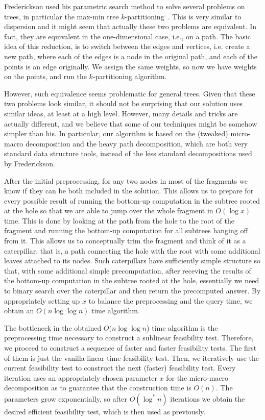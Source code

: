 \documentclass[11pt,a4paper]{article}
\theoremstyle{definition}
\theoremstyle{remark}
\begin{document}
Frederickson used his parametric search method to solve several problems on trees, in particular
the max-min tree $k$-partitioning~\cite{Frederickson1991}. This is very similar to dispersion and it might
seem that actually these two problems are equivalent. In fact, they are equivalent in the one-dimensional case,
i.e., on a path. The basic idea of this reduction, is to switch between the edges and vertices, i.e. create a new path, where each of the edges is a node in the original path, and each of the points is an edge originally. We assign the same weights, so now we have weights on the points, and run the $k$-partitioning algorithm.

However, such equivalence seems problematic for general trees. Given that these two problems look similar, it should not be surprising that our solution uses similar
ideas, at least at a high level. However, many details and tricks are actually different, and we believe
that some of our techniques might be somehow simpler than his. %
In particular, our algorithm is based on the (tweaked) micro-macro decomposition and the heavy path
decomposition, which are both very standard data structure tools, instead of the less standard
decompositions used by Frederickson.%

After the initial preprocessing, for any two nodes in most of the fragments we know if they can be
both included in the solution. This allows us to prepare for every possible result of running the
bottom-up computation in the subtree rooted at the hole so that we are able to jump over the whole
fragment in $O(\log x)$ time. This is done by looking at the path from the hole to the root of the
fragment and running the bottom-up computation for all subtrees hanging off from it. This allows
us to conceptually trim the fragment and think of it as a caterpillar, that is, a path connecting
the hole with the root with some additional leaves attached to its nodes. Such caterpillars have
sufficiently simple structure so that, with some additional simple precomputation, after receving
the results of the bottom-up computation in the subtree rooted at the hole, essentially we need
to binary search over the caterpillar and then return the precomputed answer. By appropriately
setting up $x$ to balance the preprocessing and the query time, we obtain an $O(n\log\log n)$
time algorithm.

The bottleneck in the obtained $O(n\log\log n$) time algorithm is the preprocessing time necessary
to construct a sublinear feasibility test. Therefore, we proceed to construct a sequence of
faster and faster feasibility tests. The first of them is just the vanilla linear time feasibility test.
Then, we iteratively use the current feasibility test to construct the next (faster) feasibility test.
Every iteration uses an appropriately chosen parameter $x$ for the micro-macro decomposition
as to guarantee that the construction time is $O(n)$. The parameters grow exponentially,
so after $O(\log^{*}n)$ iterations we obtain the desired efficient feasibility test, which is then
used as previously.
\end{document}
